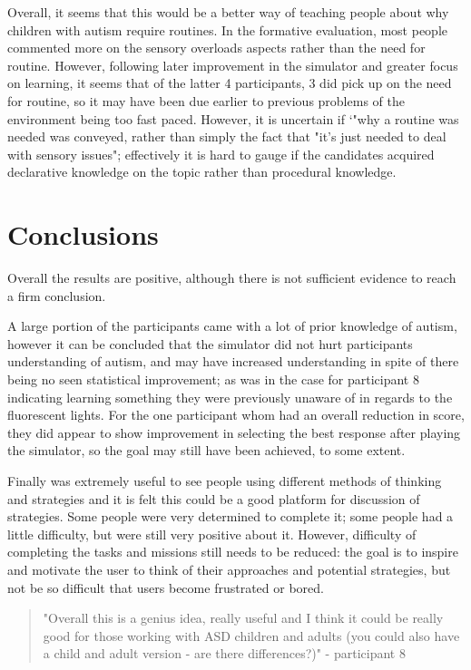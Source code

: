 \documentclass[11pt]{report}
\begin{document}
Overall, it seems that this would be a better way of teaching people about why children with autism require routines. In the formative evaluation, most people commented more on the sensory overloads aspects rather than the need for routine. However, following later improvement in the simulator and greater focus on learning, it seems that of the latter 4 participants, 3 did pick up on the need for routine, so it may have been due earlier to previous problems of the environment being too fast paced. However, it is uncertain if `"why a routine was needed was conveyed, rather than simply the fact that "it's just needed to deal with sensory issues"; effectively it is hard to gauge if the candidates acquired declarative knowledge on the topic rather than procedural knowledge.  

\section{Conclusions}
Overall the results are positive, although there is not sufficient evidence to reach a firm conclusion. 

A large portion of the participants came with a lot of prior knowledge of autism, however it can be concluded that the simulator did not hurt participants understanding of autism, and may have increased understanding in spite of there being no seen statistical improvement; as  was in the case for participant 8 indicating learning something they were previously unaware of in regards to the fluorescent lights. For the one participant whom had an overall reduction in score, they did appear to show improvement in selecting the best response after playing the simulator, so the goal may still have been achieved, to some extent. 

Finally was extremely useful to see people using different methods of thinking and strategies and it is felt this could be a good platform for discussion of strategies. Some people were very determined to complete it; some people had a little difficulty, but were still very positive about it. However, difficulty of completing the tasks and missions still needs to be reduced: the goal is to inspire and motivate the user to think of their approaches and potential strategies, but not be so difficult that users become frustrated or bored. 

\begin{quote}
"Overall this is a genius idea, really useful and I think it could be really good for those working with ASD children and adults (you could also have a child and adult version - are there differences?)" - participant 8
\end{quote}
\end{document}
